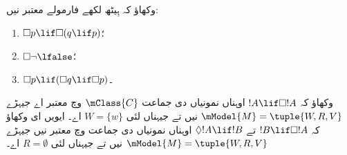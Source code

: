 \documentclass[../../../include/open-logic-section]{subfiles}
\begin{document}
\begin{prob}
  وکھاؤ کہ ہِیٹھ لکھے فارمولے معتبر نیں:
  \begin{enumerate}
  \item $\Box p \lif \Box (q \lif p)$؛
  \item $\Box \lnot \lfalse$؛
  \item $\Box p \lif (\Box q \lif \Box p)$۔
  \end{enumerate}
\end{prob}

\begin{prob}
  وکھاؤ کہ $!A \lif \Box!A$ اوہناں نمونیاں دی جماعت $\mClass{C}$ وچ معتبر اے جیہڑے
  $\mModel{M} = \tuple{W, R, V}$ نیں تے جیہناں لئی $W = \{w\}$ اے۔ ایویں ای وکھاؤ کہ
  $!B \lif \Box !A$ تے $\Diamond !A \lif !B$ اوہناں نمونیاں دی جماعت وچ معتبر نیں جیہڑے
  $\mModel{M} = \tuple{W, R, V}$ نیں تے جیہناں لئی
  $R = \emptyset$ اے۔
\end{prob}
\end{document}
